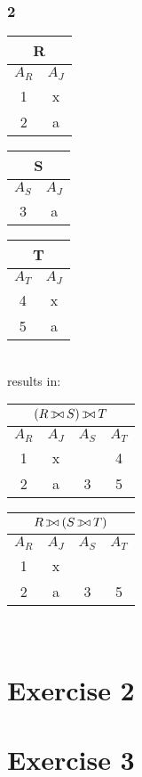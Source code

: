 \documentclass[11pt,a4paper]{scrartcl}
\def\ojoin{\setbox0=\hbox{$\bowtie$}%
  \rule[-.02ex]{.25em}{.4pt}\llap{\rule[\ht0]{.25em}{.4pt}}}
\def\leftouterjoin{\mathbin{\ojoin\mkern-5.8mu\bowtie}}
\begin{document}
\subsubsection*{2}

\begin{minipage}{.3\textwidth}
\begin{tabular}{|c|c|}
\hline
  \multicolumn{2}{|c|}{R} \\
  \hline
  $A_R$ & $A_J$\\ \hline \hline
  1 & x\\
  2 & a\\
  \hline
\end{tabular}
\end{minipage}
\begin{minipage}{.3\textwidth}
\begin{tabular}{|c|c|}
\hline
  \multicolumn{2}{|c|}{S} \\
  \hline
  $A_S$ & $A_J$\\ \hline \hline
  3 & a\\
  \hline
\end{tabular}
\end{minipage}
\begin{minipage}{.3\textwidth}
\begin{tabular}{|c|c|}
\hline
  \multicolumn{2}{|c|}{T} \\
  \hline
  $A_T$ & $A_J$\\ \hline \hline
  4 & x\\
  5 & a\\
  \hline
\end{tabular}
\end{minipage}\\

results in:\\

\begin{minipage}{.5\textwidth}
\begin{tabular}{|c|c|c|c|}
\hline
  \multicolumn{4}{|c|}{$(R \leftouterjoin S)\leftouterjoin T$} \\
  \hline
  $A_R$ & $A_J$ & $A_S$ & $A_T$\\ \hline \hline
  1 & x & & 4\\
  2 & a & 3 & 5\\
  \hline
\end{tabular}
\end{minipage}
\begin{minipage}{.5\textwidth}
\begin{tabular}{|c|c|c|c|}
\hline
  \multicolumn{4}{|c|}{$R \leftouterjoin (S\leftouterjoin T)$} \\
  \hline
$A_R$ & $A_J$ & $A_S$ & $A_T$\\ \hline \hline
  1 & x & & \\
  2 & a & 3 & 5\\
  \hline
\end{tabular}
\end{minipage}\\


\section*{Exercise 2}

\section*{Exercise 3}
\end{document}
